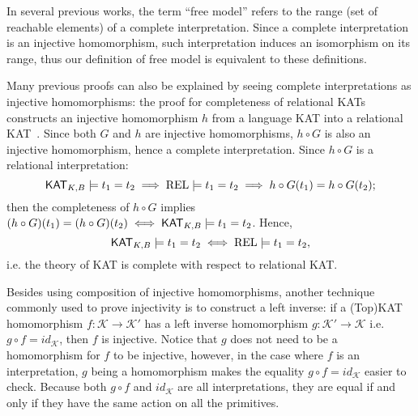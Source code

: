 In several previous works, the term ``free model'' refers to the range (set of
reachable elements) of a complete interpretation.  Since a complete
interpretation is an injective homomorphism, 
such interpretation induces an isomorphism on its range, 
thus our definition of free model is equivalent to these definitions.

Many previous proofs can also be explained by seeing complete interpretations as
injective homomorphisms: the proof for completeness of relational KATs
constructs an injective homomorphism $h$ from a language KAT into a relational
KAT~\cite{Kozen_Smith_1997}.  Since both \(G\) and \(h\) are injective
homomorphisms, \(h  \circ  G\) is also an injective homomorphism, hence a complete
interpretation.  Since \(h  \circ  G\) is a relational interpretation:
\[\mathsf{KAT}_{K, B}  \models  t_{1} = t_{2}  \implies  \mathbf{\mathrm{REL}}  \models  t_{1} = t_{2}  \implies  h  \circ  G(t_{1}) = h  \circ  G(t_{2});\]
then the completeness of \(h  \circ  G\) implies
\((h  \circ  G)(t_{1}) = (h  \circ  G)(t_{2})  \iff  \mathsf{KAT}_{K, B}  \models  t_{1} = t_{2}\). Hence,
\[\mathsf{KAT}_{K, B}  \models  t_{1} = t_{2}  \iff  \mathbf{\mathrm{REL}}  \models  t_{1} = t_{2},\]
i.e. the theory of KAT is complete with respect to relational KAT.



Besides using composition of injective homomorphisms, another technique commonly
used to prove injectivity is to construct a left inverse: 
if a (Top)KAT homomorphism \(f: \mathcal{K}  \to  \mathcal{K}'\) has a left inverse homomorphism \(g: \mathcal{K}'  \to  \mathcal{K}\) 
i.e. \(g  \circ  f = id_{\mathcal{K}}\), then \(f\) is injective.  
Notice that \(g\) does not need to be a homomorphism for \(f\) to be injective,
however, in the case where \(f\) is an interpretation, 
\(g\) being a homomorphism makes the equality \(g  \circ  f = id_{\mathcal{K}}\) easier to check.
Because both \(g  \circ  f\) and \(id_{\mathcal{K}}\) are all interpretations,
they are equal if and only if they have the same action on all the primitives.

